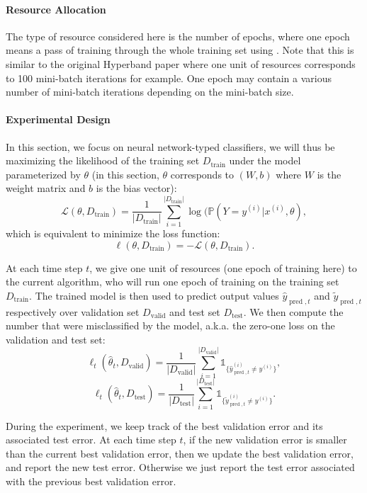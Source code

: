 \documentclass[twoside,11pt]{article}
\begin{document}
\paragraph{\textbf{Resource Allocation}} The type of resource considered here is the number of epochs, where one epoch means a pass of training through the whole training set using \SGD. Note that this is similar to the original Hyperband paper where one unit of resources corresponds to 100 mini-batch iterations for example. One epoch may contain a various number of mini-batch iterations depending on the mini-batch size.

\paragraph{\textbf{Experimental Design}} In this section, we focus on neural network-typed classifiers, we will thus be maximizing the likelihood of the training set $D_{\operatorname{train}}$ under the model parameterized by $\theta$ (in this section, $\theta$ corresponds to $(W, b)$ where $W$ is the weight matrix and $b$ is the bias vector):
\[
\mathcal{L}(\theta, D_{\operatorname{train}}) = \frac{1}{|D_{\operatorname{train}}|} \sum_{i=1}^{|D_{\operatorname{train}}|} \log (\mathbb{P}(Y=y^{(i)}|x^{(i)},\theta),
\]
which is equivalent to minimize the loss function:
\[
\ell(\theta, D_{\operatorname{train}}) = -\mathcal{L}(\theta, D_{\operatorname{train}}).
\]

At each time step $t$, we give one unit of resources (one epoch of training here) to the current algorithm, who will run one epoch of training on the training set $D_{\operatorname{train}}$. The trained model is then used to predict output values $\hat{y}_{\operatorname{pred},t}$ and $\tilde{y}_{\operatorname{pred},t}$ respectively over validation set $D_{\operatorname{valid}}$ and test set $D_{\operatorname{test}}$. We then compute the number that were misclassified by the model, a.k.a. the zero-one loss on the validation and test set:
\[
\ell_t(\hat{\theta}_t, D_{\operatorname{valid}}) = \frac{1}{|D_{\operatorname{valid}}|} \sum_{i=1}^{|D_{\operatorname{valid}}|} \mathbb{1}_{\{\hat{y}_{\operatorname{pred},t}^{(i)} \neq y^{(i)}\}},
\]
\[
\ell_t(\hat{\theta}_t, D_{\operatorname{test}}) = \frac{1}{|D_{\operatorname{test}}|} \sum_{i=1}^{|D_{\operatorname{test}}|} \mathbb{1}_{\{\tilde{y}_{\operatorname{pred},t}^{(i)} \neq y^{(i)}\}}.
\]

During the experiment, we keep track of the best validation error and its associated test error. At each time step $t$, if the new validation error is smaller than the current best validation error, then we update the best validation error, and report the new test error. Otherwise we just report the test error associated with the previous best validation error.
\end{document}
